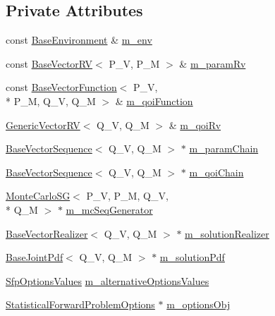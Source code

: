 \subsection*{Private Attributes}
\begin{DoxyCompactItemize}
\item 
const \hyperlink{class_q_u_e_s_o_1_1_base_environment}{Base\-Environment} \& \hyperlink{class_q_u_e_s_o_1_1_statistical_forward_problem_ab8dc530366735e9ca11290e37f95996a}{m\-\_\-env}
\item 
const \hyperlink{class_q_u_e_s_o_1_1_base_vector_r_v}{Base\-Vector\-R\-V}$<$ P\-\_\-\-V, P\-\_\-\-M $>$ \& \hyperlink{class_q_u_e_s_o_1_1_statistical_forward_problem_ab4933700b21362717461ce7da3c8a0e8}{m\-\_\-param\-Rv}
\item 
const \hyperlink{class_q_u_e_s_o_1_1_base_vector_function}{Base\-Vector\-Function}$<$ P\-\_\-\-V, \\*
P\-\_\-\-M, Q\-\_\-\-V, Q\-\_\-\-M $>$ \& \hyperlink{class_q_u_e_s_o_1_1_statistical_forward_problem_af267c75bf676bb857db1ff45fe5e4484}{m\-\_\-qoi\-Function}
\item 
\hyperlink{class_q_u_e_s_o_1_1_generic_vector_r_v}{Generic\-Vector\-R\-V}$<$ Q\-\_\-\-V, Q\-\_\-\-M $>$ \& \hyperlink{class_q_u_e_s_o_1_1_statistical_forward_problem_aa9ce415e5be95e04d6eea53c48fdea2c}{m\-\_\-qoi\-Rv}
\item 
\hyperlink{class_q_u_e_s_o_1_1_base_vector_sequence}{Base\-Vector\-Sequence}$<$ Q\-\_\-\-V, Q\-\_\-\-M $>$ $\ast$ \hyperlink{class_q_u_e_s_o_1_1_statistical_forward_problem_add86e10f5d013e532d2687b0ed58dc0e}{m\-\_\-param\-Chain}
\item 
\hyperlink{class_q_u_e_s_o_1_1_base_vector_sequence}{Base\-Vector\-Sequence}$<$ Q\-\_\-\-V, Q\-\_\-\-M $>$ $\ast$ \hyperlink{class_q_u_e_s_o_1_1_statistical_forward_problem_a0c7b7ce063c82ed96ea0a75d119a677a}{m\-\_\-qoi\-Chain}
\item 
\hyperlink{class_q_u_e_s_o_1_1_monte_carlo_s_g}{Monte\-Carlo\-S\-G}$<$ P\-\_\-\-V, P\-\_\-\-M, Q\-\_\-\-V, \\*
Q\-\_\-\-M $>$ $\ast$ \hyperlink{class_q_u_e_s_o_1_1_statistical_forward_problem_a18f3f73759fbc2e64486b11c13b3fbf5}{m\-\_\-mc\-Seq\-Generator}
\item 
\hyperlink{class_q_u_e_s_o_1_1_base_vector_realizer}{Base\-Vector\-Realizer}$<$ Q\-\_\-\-V, Q\-\_\-\-M $>$ $\ast$ \hyperlink{class_q_u_e_s_o_1_1_statistical_forward_problem_a0b855f085c84bd113827951f3c424d2d}{m\-\_\-solution\-Realizer}
\item 
\hyperlink{class_q_u_e_s_o_1_1_base_joint_pdf}{Base\-Joint\-Pdf}$<$ Q\-\_\-\-V, Q\-\_\-\-M $>$ $\ast$ \hyperlink{class_q_u_e_s_o_1_1_statistical_forward_problem_a67810b9d77e549b7eee76cc008e21e5b}{m\-\_\-solution\-Pdf}
\item 
\hyperlink{class_q_u_e_s_o_1_1_sfp_options_values}{Sfp\-Options\-Values} \hyperlink{class_q_u_e_s_o_1_1_statistical_forward_problem_a8c76cf6924787705afbd66a70954bf6a}{m\-\_\-alternative\-Options\-Values}
\item 
\hyperlink{class_q_u_e_s_o_1_1_statistical_forward_problem_options}{Statistical\-Forward\-Problem\-Options} $\ast$ \hyperlink{class_q_u_e_s_o_1_1_statistical_forward_problem_a4c286957fda7c134718422d9d4e4f1ca}{m\-\_\-options\-Obj}
\end{DoxyCompactItemize}
